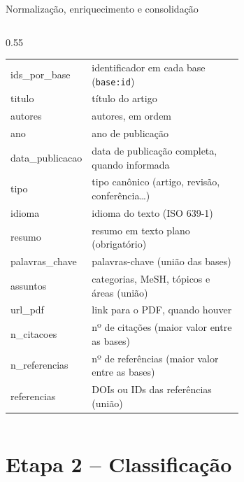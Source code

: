 \documentclass[aspectratio=169, 10pt]{beamer}
\begin{document}
\begin{frame}[t]{Normalização, enriquecimento e consolidação}
\begin{columns}[T,onlytextwidth]
\begin{column}{0.55\textwidth}
\begin{tabular}{@{}>{\ttfamily\color{radargreen}}l >{\raggedright\arraybackslash}p{0.66\linewidth}@{}}
        ids\_por\_base  & identificador em cada base (\texttt{base:id}) \\
        titulo          & título do artigo \\
        autores         & autores, em ordem \\
        ano             & ano de publicação \\
        data\_publicacao & data de publicação completa, quando informada \\
        tipo            & tipo canônico (artigo, revisão, conferência\ldots) \\
        idioma          & idioma do texto (ISO 639-1) \\
        resumo          & resumo em texto plano (obrigatório) \\
        palavras\_chave & palavras-chave (união das bases) \\
        assuntos        & categorias, MeSH, tópicos e áreas (união) \\
        url\_pdf        & link para o PDF, quando houver \\
        n\_citacoes     & nº de citações (maior valor entre as bases) \\
        n\_referencias  & nº de referências (maior valor entre as bases) \\
        referencias     & DOIs ou IDs das referências (união) \\
        \bottomrule
      \end{tabular}
    \end{column}
  \end{columns}
\end{frame}

\section{Etapa 2 -- Classificação}
\end{document}
